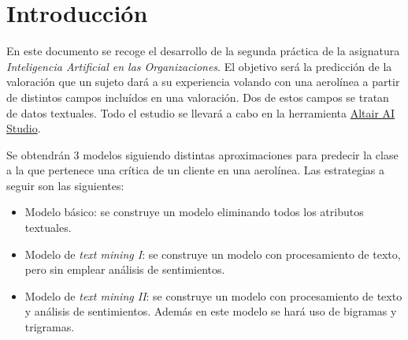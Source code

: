\documentclass[12pt]{report} %
\begin{document}
\newpage %
\thispagestyle{empty}
\mbox{}


\tableofcontents
\thispagestyle{fancy}

\newpage %
\thispagestyle{empty}
\mbox{}

 \listoffigures
 \thispagestyle{fancy}

 \newpage %
 \thispagestyle{empty}
 \mbox{}

\listoftables
 \thispagestyle{fancy}

 \newpage %
 \thispagestyle{empty}
 \mbox{}


\clearpage
{} %


\chapter{Introducción}
\label{chap:intro}
En este documento se recoge el desarrollo de la segunda práctica de la asignatura \textit{Inteligencia Artificial en las Organizaciones}. El objetivo será la predicción de la valoración que un sujeto dará a su experiencia volando con una aerolínea a partir de distintos campos incluídos en una valoración. Dos de estos campos se tratan de datos textuales. Todo el estudio se llevará a cabo en la herramienta \href{https://altair.com/altair-ai-studio}{Altair AI Studio}.

Se obtendrán 3 modelos siguiendo distintas aproximaciones para predecir la clase a la que pertenece una crítica de un cliente en una aerolínea. Las estrategias a seguir son las siguientes: 

\begin{itemize}
    \item Modelo básico: se construye un modelo eliminando todos los atributos textuales.
    \item Modelo de \textit{text mining I}: se construye un modelo con procesamiento de texto, pero sin emplear análisis de sentimientos.
    \item Modelo de \textit{text mining II}: se construye un modelo con procesamiento de texto y análisis de sentimientos. Además en este modelo se hará uso de bigramas y trigramas.
\end{itemize}
\end{document}
